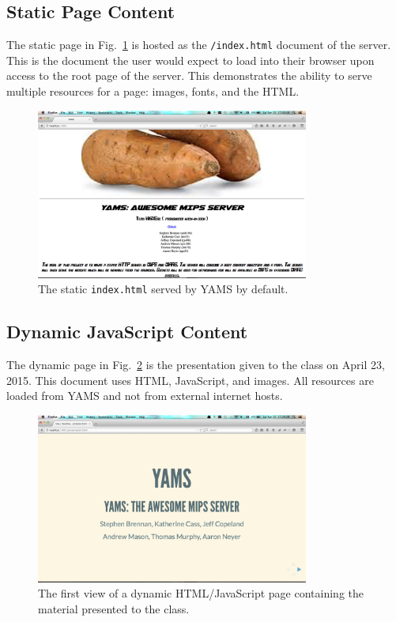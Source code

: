 \documentclass[journal,10pt]{IEEEtran}
\begin{document}
\subsection{Static Page Content}

The static page in Fig.~\ref{fig:static_document} is hosted as the \texttt{/index.html} document of the server. This is the document the user would expect to load into their browser upon access to the root page of the server. This demonstrates the ability to serve multiple resources for a page: images, fonts, and the HTML.

\begin{figure}[!t]
\centering
\includegraphics[width=0.8\textwidth,natwidth=1440,natheight=900]{static_document}
\caption{The static \texttt{index.html} served by YAMS by default.}
\label{fig:static_document}
\end{figure}

\subsection{Dynamic JavaScript Content}

The dynamic page in Fig.~\ref{fig:dynamic_document} is the presentation given to the class on April 23, 2015. This document uses HTML, JavaScript, and images. All resources are loaded from YAMS and not from external internet hosts.

\begin{figure}[!t]
\centering
\includegraphics[width=0.8\textwidth,natwidth=1440,natheight=900]{dynamic_document}
\caption{The first view of a dynamic HTML/JavaScript page containing the material presented to the class.}
\label{fig:dynamic_document}
\end{figure}
\end{document}
